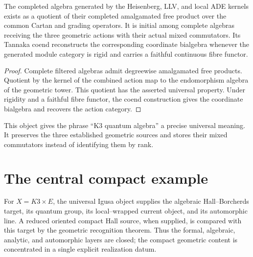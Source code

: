 \begin{theorem}
The completed algebra generated by the Heisenberg, LLV, and local ADE kernels exists as a quotient of their completed amalgamated free product over the common Cartan and grading operators.  It is initial among complete algebras receiving the three geometric actions with their actual mixed commutators.  Its Tannaka coend reconstructs the corresponding coordinate bialgebra whenever the generated module category is rigid and carries a faithful continuous fibre functor.
\end{theorem}
\begin{proof}
Complete filtered algebras admit degreewise amalgamated free products.  Quotient by the kernel of the combined action map to the endomorphism algebra of the geometric tower.  This quotient has the asserted universal property.  Under rigidity and a faithful fibre functor, the coend construction gives the coordinate bialgebra and recovers the action category.
\end{proof}

This object gives the phrase ``K3 quantum algebra'' a precise universal meaning.  It preserves the three established geometric sources and stores their mixed commutators instead of identifying them by rank.

\chapter{The central compact example}
For $X=K3\times E$, the universal Igusa object supplies the algebraic Hall--Borcherds target, its quantum group, its local--wrapped current object, and its automorphic line.  A reduced oriented compact Hall source, when supplied, is compared with this target by the geometric recognition theorem.  Thus the formal, algebraic, analytic, and automorphic layers are closed; the compact geometric content is concentrated in a single explicit realization datum.

